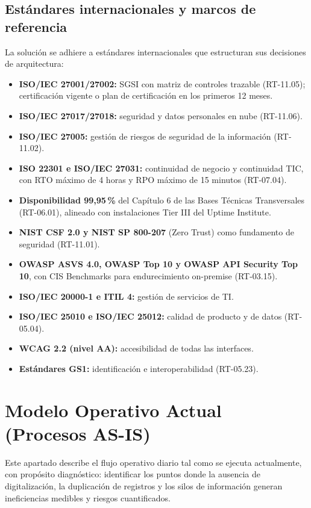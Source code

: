 \subsection{Estándares internacionales y marcos de referencia}

La solución se adhiere a estándares internacionales que estructuran sus decisiones de
arquitectura:

\begin{itemize}
  \item \textbf{ISO/IEC 27001/27002:} SGSI con matriz de controles trazable (RT-11.05);
        certificación vigente o plan de certificación en los primeros 12 meses.
  \item \textbf{ISO/IEC 27017/27018:} seguridad y datos personales en nube (RT-11.06).
  \item \textbf{ISO/IEC 27005:} gestión de riesgos de seguridad de la información
        (RT-11.02).
  \item \textbf{ISO 22301 e ISO/IEC 27031:} continuidad de negocio y continuidad TIC,
        con RTO máximo de 4 horas y RPO máximo de 15 minutos (RT-07.04).
  \item \textbf{Disponibilidad 99,95\,\%} del Capítulo 6 de las Bases Técnicas
        Transversales (RT-06.01), alineado con instalaciones Tier III del Uptime
        Institute.
  \item \textbf{NIST CSF 2.0 y NIST SP 800-207} (Zero Trust) como fundamento de
        seguridad (RT-11.01).
  \item \textbf{OWASP ASVS 4.0, OWASP Top 10 y OWASP API Security Top 10}, con CIS
        Benchmarks para endurecimiento on-premise (RT-03.15).
  \item \textbf{ISO/IEC 20000-1 e ITIL 4:} gestión de servicios de TI.
  \item \textbf{ISO/IEC 25010 e ISO/IEC 25012:} calidad de producto y de datos
        (RT-05.04).
  \item \textbf{WCAG 2.2 (nivel AA):} accesibilidad de todas las interfaces.
  \item \textbf{Estándares GS1:} identificación e interoperabilidad (RT-05.23).
\end{itemize}

\section{Modelo Operativo Actual (Procesos AS-IS)}

Este apartado describe el flujo operativo diario tal como se ejecuta actualmente, con
propósito diagnóstico: identificar los puntos donde la ausencia de digitalización, la
duplicación de registros y los silos de información generan ineficiencias medibles y
riesgos cuantificados.

